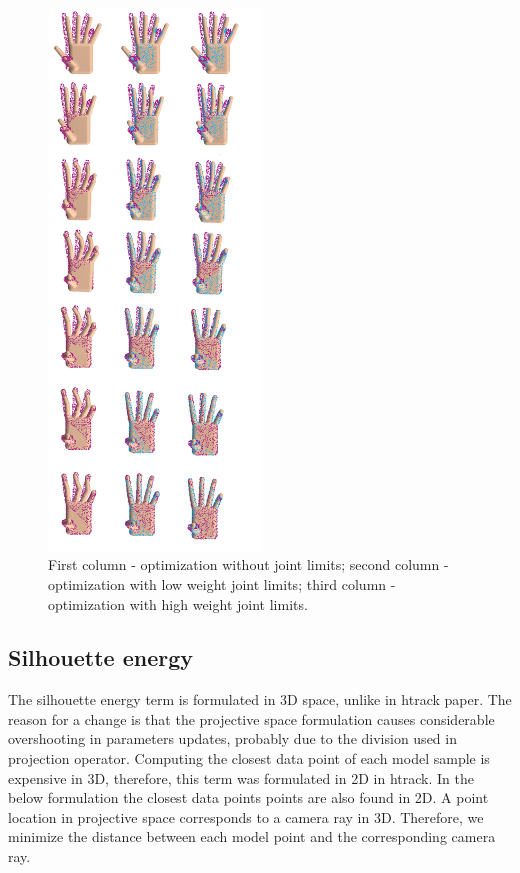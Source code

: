 \documentclass[tog]{acmsiggraph}
\begin{document}
\begin{figure}[h!] 
	\centering
	\hspace{0em}
	\includegraphics[width=0.5\textwidth]{fig/joint_limits_problems}
	\caption{First column - optimization without joint limits; second column - optimization with low weight joint limits; third column - optimization with high weight joint limits.}
	\label{fig:joint_limits_problems}
\end{figure}

\subsection{Silhouette energy}
The silhouette energy term is formulated in 3D space, unlike in htrack paper. The reason for a change is that the projective space formulation causes considerable overshooting in parameters updates, probably due to the division used in projection operator. Computing the closest data point of each model sample is expensive in 3D, therefore, this term was formulated in 2D in htrack. In the below formulation the closest data points points are also found in 2D. A point location in projective space corresponds to a camera ray  in 3D. Therefore, we minimize the distance between each model point and the corresponding camera ray.
\end{document}

